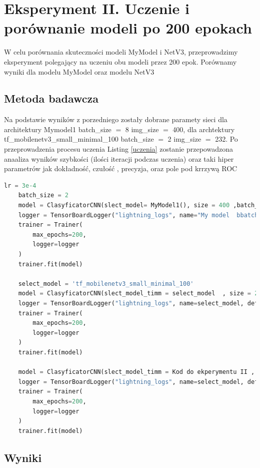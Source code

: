 \documentclass[12pt,twoside]{article}
\begin{document}
\clearpage
\section{Eksperyment II. Uczenie i porównanie modeli po 200 epokach}

W celu porównania skuteczności modeli MyModel i NetV3, przeprowadzimy eksperyment polegający na uczeniu obu modeli przez 200 epok. Porównamy wyniki dla modelu MyModel oraz modelu NetV3

\subsection{Metoda badawcza}
Na podstawie wyników z porzedniego zostały dobrane paramety sieci dla architektury Mymodel1 batch\_size $=$ 8 img\_size $=$ 400, dla archtektury tf\_mobilenetv3\_small\_minimal\_100 batch\_size $=$ 2 img\_size $=$ 232. Po przeprowadzenia procesu uczenia  Listing \ref{uczenia}
zostanie przepowadzona anaaliza wyników szybkości (ilości iteracji podczas uczenia) oraz taki hiper parametrów jak dokładność, czułość , precyzja, oraz pole pod krrzywą ROC
\begin{lstlisting}[language=Python,caption=Kod do ekperymentu II. ,label={uczenia}]
    lr = 3e-4
    batch_size = 2
    model = ClasyficatorCNN(slect_model= MyModel1(), size = 400 ,batch_size=8 ,lr=lr)
    logger = TensorBoardLogger("lightning_logs", name="My model  bbatch_size:" , default_hp_metric=True)
    trainer = Trainer(
        max_epochs=200,
        logger=logger
    )
    trainer.fit(model)

    select_model = 'tf_mobilenetv3_small_minimal_100'
    model = ClasyficatorCNN(slect_model_timm = select_model  , size = 232 ,batch_size=2,lr=lr,pretrained=False)
    logger = TensorBoardLogger("lightning_logs", name=select_model, default_hp_metric=False)
    trainer = Trainer(
        max_epochs=200,
        logger=logger
    )
    trainer.fit(model)

    model = ClasyficatorCNN(slect_model_timm = Kod do ekperymentu II , size = 232 ,batch_size=2,lr=lr,pretrained=True)
    logger = TensorBoardLogger("lightning_logs", name=select_model, default_hp_metric=False)
    trainer = Trainer(
        max_epochs=200,
        logger=logger
    )
    trainer.fit(model)
\end{lstlisting}

\subsection{Wyniki}
\end{document}
